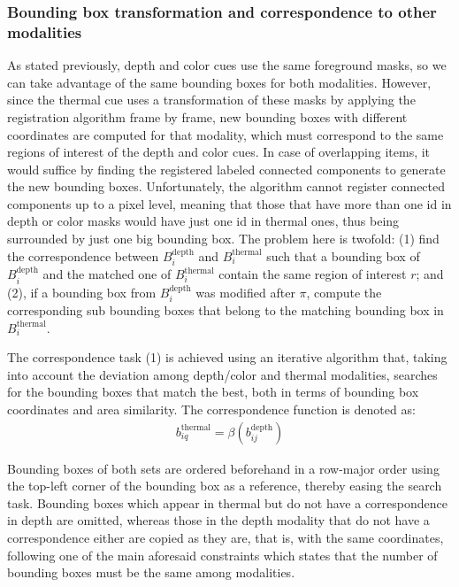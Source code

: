 \documentclass[10pt,twocolumn,letterpaper]{article}
\begin{document}
\subsubsection{Bounding box transformation and correspondence to other modalities} 
\label{sssec:cpcode}
As stated previously, depth and color cues use the same foreground masks, so we can take advantage of the same bounding boxes for both modalities. However, since the thermal cue uses a transformation of these masks by applying the registration algorithm frame by frame, new bounding boxes with different coordinates are computed for that modality, which must correspond to the same regions of interest of the depth and color cues. In case of overlapping items, it would suffice by finding the registered labeled connected components to generate the new bounding boxes. Unfortunately, the algorithm cannot register connected components up to a pixel level, meaning that those that have more than one id in depth or color masks would have just one id in thermal ones, thus being surrounded by just one big bounding box. The problem here is twofold: (1) find the correspondence between $B^\mathrm{depth}_i$ and $B^\mathrm{thermal}_i$ such that a bounding box of $B^\mathrm{depth}_i$ and the matched one of $B^\mathrm{thermal}_i$ contain the same region of interest $r$; and (2), if a bounding box from $B^\mathrm{depth}_i$ was modified after $\pi$, compute the corresponding sub bounding boxes that belong to the matching bounding box in $B^\mathrm{thermal}_i$.   

The correspondence task (1) is achieved using an iterative algorithm that, taking into account the deviation among depth/color and thermal modalities, searches for the bounding boxes that match the best, both in terms of bounding box coordinates and area similarity. The correspondence function is denoted as:
\begin{gather}
b^\mathrm{thermal}_{iq} =  \beta(b^\mathrm{depth}_{ij})
\end{gather}
 
Bounding boxes of both sets are ordered beforehand in a row-major order using the top-left corner of the bounding box as a reference, thereby easing the search task. Bounding boxes which appear in thermal but do not have a correspondence in depth are omitted, whereas those in the depth modality that do not have a correspondence either are copied as they are, that is, with the same coordinates, following one of the main aforesaid constraints which states that the number of bounding boxes must be the same among modalities.
\end{document}
